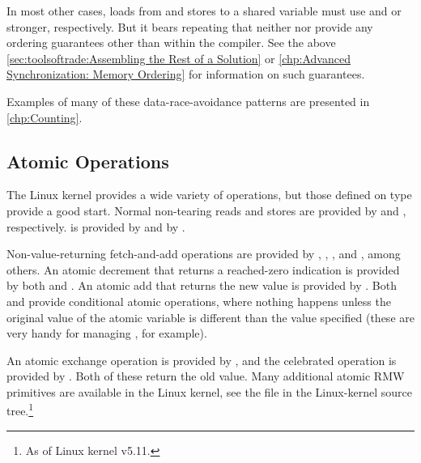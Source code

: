 \QuickQuizEnd

In most other cases, loads from and stores to a shared variable must
use  and  or stronger, respectively.
But it bears repeating that neither  nor 
provide any ordering guarantees other than within the compiler.
See the above
\cref{sec:toolsoftrade:Assembling the Rest of a Solution} or
\cref{chp:Advanced Synchronization: Memory Ordering}
for information on such guarantees.

Examples of many of these data-race-avoidance patterns are presented in
\cref{chp:Counting}.

\subsection{Atomic Operations}
\label{sec:toolsoftrade:Atomic Operations}

The Linux kernel provides a wide variety of  operations, but
those defined on type  provide a good start.
Normal non-tearing reads and stores are provided by
 and , respectively.
 is provided by  and
 by .

Non-value-returning fetch-and-add operations are provided by
, , , and
, among others.
An atomic decrement that returns a reached-zero indication is provided
by both  and .
An atomic add that returns the new value is provided by
.
Both  and  provide
conditional atomic operations, where nothing happens unless the
original value of the atomic variable is different than the value
specified (these are very handy for managing
, for example).

An atomic exchange operation is provided by , and
the celebrated  operation is provided by
.
Both of these return the old value.
Many additional atomic RMW primitives are available in the Linux kernel,
see the  file in the Linux-kernel
source tree.\footnote{
	As of Linux kernel v5.11.
}

